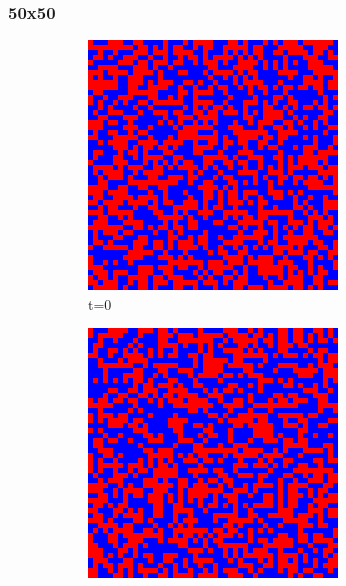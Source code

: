 \documentclass[a4paper, 11pt]{article}
\begin{document}
\subsubsection{50x50}
\begin{figure}[H]
\centering
\begin{subfigure}{.25\textwidth}
  \centering
  \includegraphics[width=0.9\linewidth]{SNOWDRIFT_MOORE_50x50_t00}
  \caption{t=0}
\end{subfigure}%
\begin{subfigure}{.25\textwidth}
  \centering
  \includegraphics[width=0.9\linewidth]{SNOWDRIFT_MOORE_50x50_t01}

\end{subfigure}
\end{figure}
\end{document}
